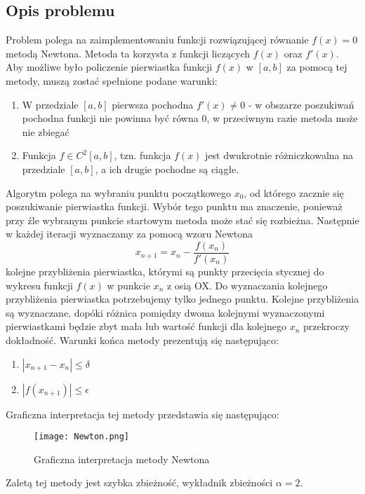\documentclass{article}
\begin{document}
\subsection{Opis problemu}
Problem polega na zaimplementowaniu funkcji rozwiązującej równanie $f(x) = 0$ metodą Newtona. Metoda ta korzysta z funkcji liczących $f(x)$ oraz $f'(x)$. Aby możliwe było policzenie pierwiastka funkcji $f(x)$ w $[a,b]$ za pomocą tej metody, muszą zostać spełnione podane warunki:
\vspace{20pt}
\begin{enumerate}
    \item W przedziale $[a,b]$ pierwsza pochodna $f'(x) \neq 0$ - w obszarze poszukiwań pochodna funkcji nie powinna być równa $0$, w przeciwnym razie metoda może nie zbiegać
    \item Funkcja $f \in C^2[a,b]$, tzn. funkcja $f(x)$ jest dwukrotnie różniczkowalna na przedziale $[a,b]$, a ich drugie pochodne są ciągłe.
\end{enumerate}
Algorytm polega na wybraniu punktu początkowego $x_0$, od którego zacznie się poszukiwanie pierwiastka funkcji. Wybór tego punktu ma znaczenie, ponieważ przy źle wybranym punkcie startowym metoda może stać się rozbieżna. Następnie w każdej iteracji wyznaczamy za pomocą wzoru Newtona
$$ x_{n+1} = x_n - \frac{f(x_n)}{f'(x_n)} $$
kolejne przybliżenia pierwiastka, którymi są punkty przecięcia stycznej do wykresu funkcji $f(x)$ w punkcie $x_n$ z osią OX. Do wyznaczania kolejnego przybliżenia pierwiastka potrzebujemy tylko jednego punktu. Kolejne przybliżenia są wyznaczane, dopóki różnica pomiędzy dwoma kolejnymi wyznaczonymi pierwiastkami będzie zbyt mała lub wartość funkcji dla kolejnego $x_n$ przekroczy dokładność. Warunki końca metody prezentują się następująco:
\begin{enumerate}
    \item $|x_{n+1} - x_n| \leq \delta$
    \item $|f(x_{n+1})| \leq \epsilon$
\end{enumerate}
Graficzna interpretacja tej metody przedstawia się następująco:

\begin{figure}[H] 
\centering
\texttt{[image: Newton.png]}
\caption{Graficzna interpretacja metody Newtona}
\label{Newton}
\end{figure}
Zaletą tej metody jest szybka zbieżność, wykładnik zbieżności $\alpha = 2$.
\end{document}
